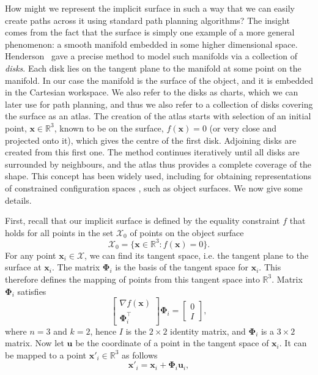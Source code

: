How might we represent the implicit surface in such a way that we can easily create paths across it using standard path planning algorithms?  The insight comes from the fact that the surface is simply one example of a more general phenomenon: a smooth manifold embedded in some higher dimensional space. Henderson~\cite{Henderson1993COMPUTING} gave a precise method to model such manifolds via a collection of \emph{disks}. Each disk lies on the tangent plane to the manifold at some point on the manifold. 
In our case the manifold is the surface of the object, and it is embedded in the Cartesian workspace. We also refer to the disks as charts, which we can later use for path planning, and thus we also refer to a collection of disks covering the surface as an atlas. The creation of the atlas starts with selection of an initial point, $\mathbf{x} \in \mathbb{R}^3$, known to be on the surface, $f(\mathbf{x}) = 0$ (or very close and projected onto it), which gives the centre of the first disk. Adjoining disks are created from this first one. The method continues iteratively until all disks are surrounded by neighbours, and the atlas thus provides a complete coverage of the shape. This concept has been widely used, including for obtaining representations of constrained configuration spaces \cite{Porta2014CuikSuite}, such as object surfaces. We now give some details.

First, recall that our implicit surface is defined by the equality constraint $f$ that holds for all points in the set $\mathcal{X_0}$ of points on the object surface
\begin{equation}
\mathcal{X_0} = \{\mathbf{x} \in \mathbb{R}^3 : f(\mathbf{x}) = 0 \}.
\end{equation}
For any point $\mathbf{x}_i \in \mathcal{X}$, we can find its tangent space, i.e. the tangent plane to the surface at $\mathbf{x}_i$. The matrix $\boldsymbol{\Phi}_i$ is the basis of the tangent space for $\mathbf{x}_i$. This therefore defines the mapping of points from this tangent space into $\mathbb{R}^3$.
Matrix $\boldsymbol{\Phi}_i$ satisfies
\begin{equation}
\begin{bmatrix} \nabla f(\mathbf{x}) \\ \boldsymbol{\Phi}_i^\top \end{bmatrix} \boldsymbol{\Phi}_i = \begin{bmatrix}  0 \\ I \end{bmatrix}, \label{eq:tangent_basis}
\end{equation}
where $n=3$ and $k=2$, hence $I$ is the $2\times2$ identity matrix, and $\boldsymbol{\Phi}_i$ is a $3\times2$ matrix. 
Now let $\mathbf{u}$ be the coordinate of a point in the tangent space of $\mathbf{x}_i$. It can be mapped to a point $\mathbf{x}'_i \in \mathbb{R}^3$ as follows
\begin{equation}
  \mathbf{x}'_i = \mathbf{x}_i + \boldsymbol{\Phi}_i \mathbf{u}_i, \label{eq:tangent_approx}
\end{equation}

